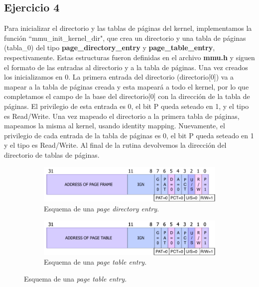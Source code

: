 \documentclass[a4paper]{article}
\begin{document}
\subsection{Ejercicio 4}
\justify
Para inicializar el directorio y las tablas de páginas del kernel, implementamos la función ``mmu_init_kernel_dir", que crea un directorio y una tabla de páginas (tabla_0) del tipo \textbf{page_directory_entry}  y \textbf{page_table_entry}, respectivamente. Estas estructuras fueron definidas en el archivo \textbf{mmu.h} y siguen el formato de las entradas al directorio y a la tabla de páginas. Una vez creados los inicializamos en 0.
\justify
La primera entrada del directorio (directorio[0]) va a mapear a la tabla de páginas creada y esta mapeará a todo el kernel, por lo que completamos el campo de la base del directorio[0] con la dirección de la tabla de páginas. El privilegio de esta entrada es 0, el bit P queda seteado en 1, y el tipo es Read/Write. Una vez mapeado el directorio a la primera tabla de páginas, mapeamos la misma al kernel, usando identity mapping. Nuevamente, el privilegio de cada entrada de la tabla de páginas es 0, el bit P queda seteado en 1 y el tipo es Read/Write. Al final de la rutina devolvemos la dirección del directorio de tablas de páginas. 
 
 \begin{figure}[h!]
 	\centering
 	\begin{subfigure}[b]{0.49 \textwidth}
 		\includegraphics[width=\textwidth]{img/pde.pdf}
 		\caption{Esquema de una \textit{page directory entry}.}
 	\end{subfigure}
 	\hfill
 	\begin{subfigure}[b]{0.49 \textwidth}
 		\includegraphics[width=\textwidth]{img/pte.pdf}
 		\caption{Esquema de una \textit{page table entry.}}
 	\end{subfigure}
 \end{figure}
\end{document}
